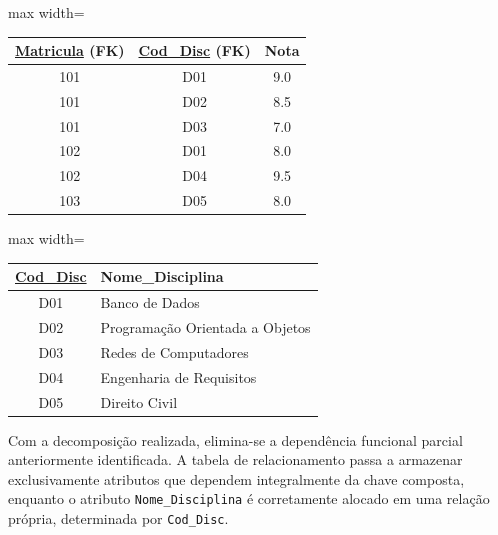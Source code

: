 \begin{tcolorbox}[breakable, colback=blue!5,colframe=blue!40!black,title=Situação exemplo]
\vspace{0.5cm}

\begin{adjustbox}{max width=\textwidth}
\begin{tabular}{|c|c|c|}
\hline
\textbf{\underline{Matricula} (FK)} & \textbf{\underline{Cod\_Disc} (FK)} & \textbf{Nota} \\ \hline
101 & D01 & 9.0 \\ \hline
101 & D02 & 8.5 \\ \hline
101 & D03 & 7.0 \\ \hline
102 & D01 & 8.0 \\ \hline
102 & D04 & 9.5 \\ \hline
103 & D05 & 8.0 \\ \hline
\end{tabular}
\end{adjustbox}
\vspace{0.3cm}
\label{tab:2fn_relacionamento}

\vspace{0.5cm}

\begin{adjustbox}{max width=\textwidth}
\begin{tabular}{|c|l|}
\hline
\textbf{\underline{Cod\_Disc}} & \textbf{Nome\_Disciplina} \\ \hline
D01 & Banco de Dados \\ \hline
D02 & Programação Orientada a Objetos \\ \hline
D03 & Redes de Computadores \\ \hline
D04 & Engenharia de Requisitos \\ \hline
D05 & Direito Civil \\ \hline
\end{tabular}
\end{adjustbox}
\vspace{0.3cm}
\label{tab:2fn_disciplina}

\vspace{0.4cm}

\justify

Com a decomposição realizada, elimina-se a dependência funcional parcial anteriormente identificada. A tabela de relacionamento passa a armazenar exclusivamente atributos que dependem integralmente da chave composta, enquanto o atributo \texttt{Nome\_Disciplina} é corretamente alocado em uma relação própria, determinada por \texttt{Cod\_Disc}.


\end{tcolorbox}
